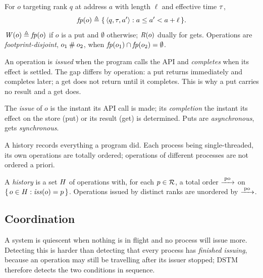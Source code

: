 \begin{definition}[Footprint]\label{def:footprint}
For $o$ targeting rank $q$ at address $a$ with length $\ell$ and effective
time $\tau$,
\[
  \mathit{fp}(o) \triangleq \{\, \langle q, \tau, a'\rangle : a \le a' < a + \ell \,\}.
\]
$\mathit{W}(o) \triangleq \mathit{fp}(o)$ if $o$ is a put and $\emptyset$ otherwise;
$\mathit{R}(o)$ dually for gets. Operations are \emph{footprint-disjoint},
$o_1 \mathbin{\#} o_2$, when $\mathit{fp}(o_1) \cap \mathit{fp}(o_2) = \emptyset$.
\end{definition}

An operation is \emph{issued} when the program calls the API and
\emph{completes} when its effect is settled. The gap differs by operation: a
put returns immediately and completes later; a get does not return until it
completes. This is why a put carries no result and a get does.

\begin{definition}\label{def:issue-complete}
The \emph{issue} of $o$ is the instant its API call is made; its
\emph{completion} the instant its effect on the store (put) or its result
(get) is determined. Puts are \emph{asynchronous}, gets \emph{synchronous}.
\end{definition}

A history records everything a program did. Each process being
single-threaded, its own operations are totally ordered; operations of
different processes are not ordered a priori.

\begin{definition}\label{def:history}
A \emph{history} is a set $H$ of operations with, for each $p \in \mathcal{R}$,
a total order $\xrightarrow{\;\mathrm{po}\;}$ on $\{\, o \in H : \mathit{iss}(o) = p \,\}$. Operations
issued by distinct ranks are unordered by $\xrightarrow{\;\mathrm{po}\;}$.
\end{definition}

\subsection{Coordination}
\label{sec:gloss-coord}

A system is quiescent when nothing is in flight and no process will issue
more. Detecting this is harder than detecting that every process has
\emph{finished issuing}, because an operation may still be travelling after
its issuer stopped; DSTM therefore detects the two conditions in sequence.

